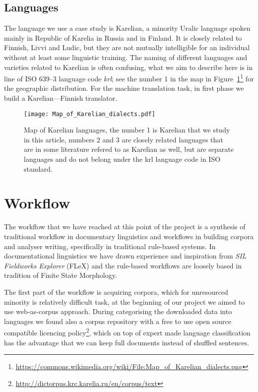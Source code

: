 \documentclass{flammie}
\begin{document}
\subsection{Languages}

The language we use a case study is Karelian, a minority Uralic language spoken
mainly in Republic of Karelia in Russia and in Finland. It is closely related
to Finnish, Livvi and Ludic, but they are not mutually intelligible for an
individual without at least some linguistic training. The naming of different
languages and varieties related to Karelian is often confusing, what we aim to
describe here is in line of ISO 639--3 language code \textit{krl}; see the
number 1 in the map in
Figure~\ref{fig:krl-map}\footnote{\url{https://commons.wikimedia.org/wiki/File:Map_of_Karelian_dialects.png}}
for the geographic distribution. For the machine translation task, in first
phase we build a Karelian---Finnish translator.

\begin{figure}
    \texttt{[image: Map\_of\_Karelian\_dialects.pdf]}
    \caption{Map of Karelian languages, the number 1 is Karelian that
    we study in this article, numbers 2 and 3 are closely related languages
    that are in some literature refered to as Karelian as well, but are
    separate languages and do not belong under the krl language code in
    ISO standard.\label{fig:krl-map}}
\end{figure}

\section{Workflow}
\label{sec:workflow}

The workflow that we have reached at this point of the project is a synthesis
of traditional workflow in documentary linguistics and workflows in building
corpora and analyser writing, specifically in traditional rule-based systems.
In documentational linguistics we have drawn experience and inspiration from
\textit{SIL Fieldworks Explorer} (FLeX) and the rule-based workflows are
loosely based in tradition of Finite State Morphology.

The first part of the workflow is acquiring corpora, which for unresourced
minority is relatively difficult task, at the beginning of our project we aimed
to use web-as-corpus\cite{} approach. During categorising the downloaded data
into languages we found also a corpus repository with a free to use open source
compatible licencing
policy\footnote{\url{http://dictorpus.krc.karelia.ru/en/corpus/text}}, which on
top of expert made language classification has the advantage that we can keep
full documents instead of shuffled sentences.
\end{document}
